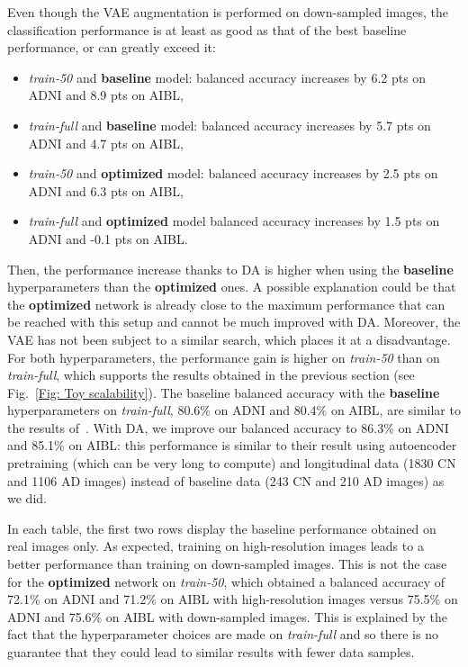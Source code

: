 \documentclass[10pt,journal,compsoc]{IEEEtran}
\begin{document}

Even though the VAE augmentation is performed on down-sampled images, the classification performance is at least as good as that of the best baseline performance, or can greatly exceed it:
\begin{itemize}
    \item \textit{train-50} and \textbf{baseline} model: balanced accuracy increases by 6.2 pts on ADNI and 8.9 pts on AIBL,
    \item \textit{train-full} and \textbf{baseline} model: balanced accuracy increases by 5.7 pts on ADNI and 4.7 pts on AIBL,
    \item \textit{train-50} and \textbf{optimized} model: balanced accuracy increases by 2.5 pts on ADNI and 6.3 pts on AIBL,
    \item \textit{train-full} and \textbf{optimized} model balanced accuracy increases by 1.5 pts on ADNI and -0.1 pts on AIBL.
\end{itemize}

Then, the performance increase thanks to DA is higher when using the \textbf{baseline} hyperparameters than the \textbf{optimized} ones. A possible explanation could be that the \textbf{optimized} network is already close to the maximum performance that can be reached with this setup and cannot be much improved with DA. Moreover, the VAE has not been subject to a similar search, which places it at a disadvantage. For both hyperparameters, the performance gain is higher on \textit{train-50} than on \textit{train-full}, which supports the results obtained in the previous section (see Fig.~\ref{Fig: Toy scalability}). The baseline balanced accuracy with the \textbf{baseline} hyperparameters on \textit{train-full}, 80.6\% on ADNI and 80.4\% on AIBL, are similar to the results of~\cite{wen_convolutional_2020}. With DA, we improve our balanced accuracy to 86.3\% on ADNI and 85.1\% on AIBL: this performance is similar to their result using autoencoder pretraining (which can be very long to compute) and longitudinal data (1830 CN and 1106 AD images) instead of baseline data (243 CN and 210 AD images) as we did.

In each table, the first two rows display the baseline performance obtained on real images only. As expected, training on high-resolution images leads to a better performance than training on down-sampled images. This is not the case for the \textbf{optimized} network on \textit{train-50}, which obtained a balanced accuracy of 72.1\% on ADNI and 71.2\% on AIBL with high-resolution images versus 75.5\% on ADNI and 75.6\% on AIBL with down-sampled images. This is explained by the fact that the hyperparameter choices are made on \textit{train-full} and so there is no guarantee that they could lead to similar results with fewer data samples.
\end{document}
